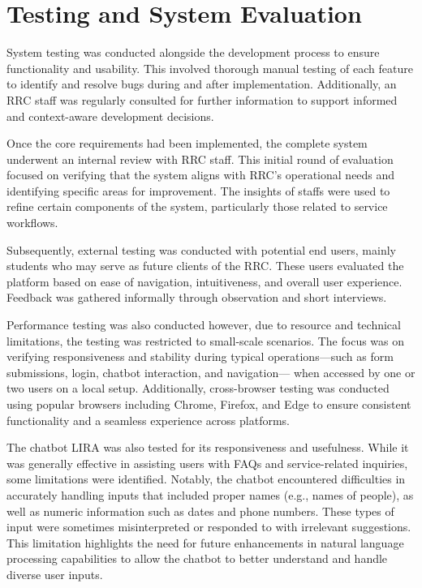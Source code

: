 \section{Testing and System Evaluation}

System testing was conducted alongside the development process to ensure functionality and usability. This involved thorough manual testing of each feature to identify and resolve bugs during and after implementation. Additionally, an RRC staff was regularly consulted for further information to support informed and context-aware development decisions.

Once the core requirements had been implemented, the complete system underwent an internal review with RRC staff. This initial round of evaluation focused on verifying that the system aligns with RRC's operational needs and identifying specific areas for improvement. The insights of staffs were used to refine certain components of the system, particularly those related to service workflows. 

Subsequently, external testing was conducted with potential end users, mainly students who may serve as future clients of the RRC. These users evaluated the platform based on ease of navigation, intuitiveness, and overall user experience. Feedback was gathered informally through observation and short interviews.

Performance testing was also conducted however, due to resource and technical limitations, the testing was restricted to small-scale scenarios. The focus was on verifying responsiveness and stability during typical operations—such as form submissions, login, chatbot interaction, and navigation— when accessed by one or two users on a local setup. Additionally, cross-browser testing was conducted using popular browsers including Chrome, Firefox, and Edge to ensure consistent functionality and a seamless experience across platforms.

The chatbot LIRA was also tested for its responsiveness and usefulness. While it was generally effective in assisting users with FAQs and service-related inquiries, some limitations were identified. Notably, the chatbot encountered difficulties in accurately handling inputs that included proper names (e.g., names of people), as well as numeric information such as dates and phone numbers. These types of input were sometimes misinterpreted or responded to with irrelevant suggestions. This limitation highlights the need for future enhancements in natural language processing capabilities to allow the chatbot to better understand and handle diverse user inputs.


